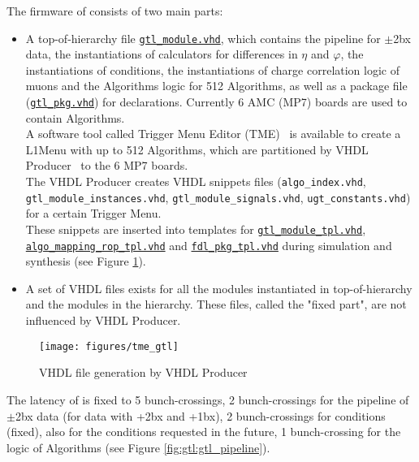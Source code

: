 The firmware of \ugtl consists of two main parts:
\begin{itemize}
\item A top-of-hierarchy file \href{\gitbranch/firmware/hdl/payload/gtl\_module\_tpl.vhd}{\texttt{\textquotesingle gtl\_module.vhd\textquotesingle }}, which contains the pipeline for $\pm$2bx data, the instantiations of calculators for differences in $\eta$ and $\varphi$, the instantiations of conditions, the instantiations of charge correlation logic of muons and the Algorithms logic for 512 Algorithms, as well as a package file (\href{\gitbranch/firmware/hdl/packages/gtl\_pkg.vhd}{\texttt{\textquotesingle gtl\_pkg.vhd\textquotesingle }}) for declarations.
Currently 6 AMC (MP7) boards are used to contain Algorithms.\\
A software tool called Trigger Menu Editor (TME)~\cite{TME_repo} is available to create a L1Menu with up to 512 Algorithms, which are partitioned by VHDL Producer~\cite{VHDL_Producer} to the 6 MP7 boards.\\
The VHDL Producer creates VHDL snippets files (\texttt{algo\_index.vhd}, \texttt{gtl\_module\_instances.vhd}, \texttt{gtl\_module\_signals.vhd}, \texttt{ugt\_constants.vhd}) for a certain Trigger Menu.\\
These snippets are inserted into templates for \href{\gitbranch/firmware/hdl/payload/gtl\_module\_tpl.vhd}{\texttt{\textquotesingle gtl\_module\_tpl.vhd\textquotesingle }}, \href{\gitbranch/firmware/hdl/payload/fdl/algo_mapping_rop_tpl.vhd}{\texttt{\textquotesingle algo\_mapping\_rop\_tpl.vhd\textquotesingle }} and \href{\gitbranch/firmware/hdl/packages/fdl_pkg_tpl.vhd}{\texttt{\textquotesingle fdl\_pkg\_tpl.vhd\textquotesingle }} during simulation and synthesis (see Figure \ref{fig:gtl:tme_gtl}).
\item A set of VHDL files exists for all the modules instantiated in top-of-hierarchy and the modules in the hierarchy. These files, called the "fixed part", are not influenced by VHDL Producer.
\end{itemize}

\begin{figure}[htb]
\centering
\texttt{[image: figures/tme\_gtl]}
\caption{VHDL file generation by VHDL Producer}
\label{fig:gtl:tme_gtl}
\end{figure}

The latency of \ugtl is fixed to 5 bunch-crossings,
2 bunch-crossings for the pipeline of $\pm$2bx data (for data with +2bx and +1bx), 2 bunch-crossings for conditions (fixed), also for the conditions requested in the future, 1 bunch-crossing for the logic of Algorithms (see Figure \ref{fig:gtl:gtl_pipeline}).\\

